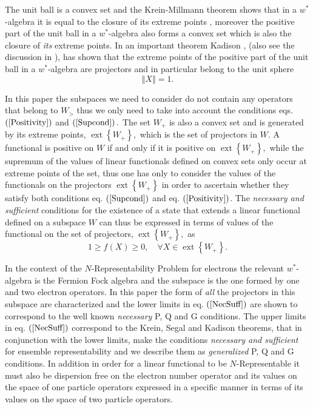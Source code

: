 \documentclass[aps,preprint,amsfonts,amssymb,showpacs,showkeys]{revtex4}%
\begin{document}
The unit ball is a convex set and the Krein-Millmann theorem \cite{Encyclo}
shows that in a $w^{\ast}$-algebra \cite{Encyclo} it is equal to the closure
of its extreme points \cite{Kummar67}, moreover the positive part of the unit
ball in a $w^{\ast}$-algebra also forms a convex set which is also the closure
of \emph{its} extreme points. In an important theorem Kadison \cite{Kadison},
(also see the discussion in \cite{Takesaki}), has shown that the extreme
points of the positive part of the unit ball in a $w^{\ast}$-algebra are
projectors and in particular belong to the unit sphere
\begin{equation}
\left\Vert X\right\Vert =1.
\end{equation}


In this paper the subspaces we need to consider do not contain any operators
that belong to $W_{>}$ thus we only need to take into account the conditions
eqs. $\left(  \ref{Positivity}\right)  $ and $\left(  \ref{Supcond}\right)  .$
The set $W_{+}$ is also a convex set and is generated by its extreme points,
$\operatorname*{ext}\left\{  W_{+}\right\}  ,$ which is the set of projectors
in $W.$ A functional is positive on $W$ if and only if it is positive on
$\operatorname*{ext}\left\{  W_{+}\right\}  ,$ while the supremum of the
values of linear functionals defined on convex sets only occur at extreme
points of the set, thus one has only to consider the values of the functionals
on the projectors $\operatorname*{ext}\left\{  W_{+}\right\}  $ in order to
ascertain whether they satisfy both conditions eq. $\left(  \ref{Supcond}%
\right)  $ and eq. $\left(  \ref{Positivity}\right)  $. The \emph{necessary
and sufficient }conditions for the existence of a state that extends a linear
functional defined on a subspace $W$ can thus be expressed in terms of values
of the functional on the set of projectors, $\operatorname*{ext}\left\{
W_{+}\right\}  ,$ as
\begin{equation}
1\geq f\left(  X\right)  \geq0,\quad\forall X\in\operatorname*{ext}\left\{
W_{+}\right\}  . \label{NecSuff}%
\end{equation}


In the context of the $N$-Representability Problem for electrons the relevant
$w^{\ast}$-algebra is the Fermion Fock algebra and the subspace is the one
formed by one and two electron operators. In this paper the form of \emph{all
}the projectors in this subspace are characterized and the lower limits in eq.
$\left(  \ref{NecSuff}\right)  $ are shown to correspond to the well known
\cite{PQG} \emph{necessary} P, Q and G conditions. The upper limits in eq.
$\left(  \ref{NecSuff}\right)  $ correspond to the Krein, Segal and Kadison
theorems, that in conjunction with the lower limits, make the conditions
\emph{necessary and sufficient }for ensemble representability and we describe
them as \emph{generalized }P, Q and G conditions. In addition in order for a
linear functional to be $N$-Representable it must also be dispersion free on
the electron number operator and its values on the space of one particle
operators expressed in a specific manner in terms of its values on the space
of two particle operators.
\end{document}
